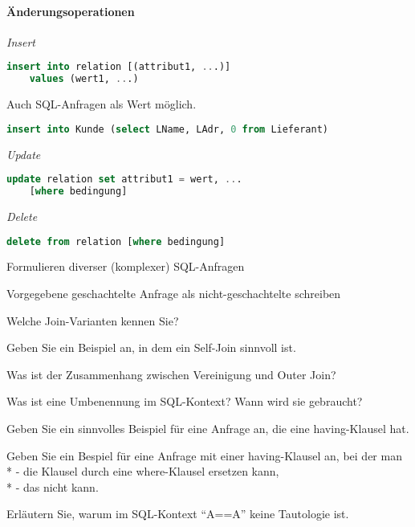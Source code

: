 \paragraph{Änderungsoperationen}
\begin{items}
	\item \emph{Insert}
	\begin{lstlisting}[language=sql]
insert into relation [(attribut1, ...)]
	values (wert1, ...)
	\end{lstlisting}
	
	\item Auch SQL-Anfragen als Wert möglich.
	\begin{lstlisting}[language=sql]
insert into Kunde (select LName, LAdr, 0 from Lieferant)
	\end{lstlisting}
	
	\item \emph{Update}
	\begin{lstlisting}[language=sql]
update relation set attribut1 = wert, ... 
	[where bedingung]
	\end{lstlisting}
	
	\item \emph{Delete}
	\begin{lstlisting}[language=sql]
delete from relation [where bedingung]
	\end{lstlisting}
\end{items}

\begin{fragen}
	\item Formulieren diverser (komplexer) SQL-Anfragen
	\item Vorgegebene geschachtelte Anfrage als nicht-geschachtelte schreiben
	\item Welche Join-Varianten kennen Sie?
	\item Geben Sie ein Beispiel an, in dem ein Self-Join sinnvoll ist.
	\item Was ist der Zusammenhang zwischen Vereinigung und Outer Join?
	\item Was ist eine Umbenennung im SQL-Kontext? Wann wird sie gebraucht?
	\item Geben Sie ein sinnvolles Beispiel für eine Anfrage an, die eine having-Klausel hat.
	\item Geben Sie ein Bespiel für eine Anfrage mit einer having-Klausel an, bei der man \\*
		- die Klausel durch eine where-Klausel ersetzen kann, \\*
		- das nicht kann.
	\item Erläutern Sie, warum im SQL-Kontext ``A==A'' keine Tautologie ist.
\end{fragen}